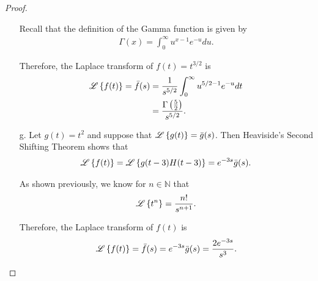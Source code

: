 \begin{proof}
\begin{enumerate}
      Recall that the definition of the Gamma function is given by
      \begin{align*}
        \Gamma(x) = \int_0^\infty u^{x-1} e^{-u} du.
      \end{align*}

      Therefore, the Laplace transform of $f(t) = t^{3/2}$ is
      \begin{align*}
        \mathscr{L}\left\{ {f(t)} \right\} = \bar{f}(s)
        &= \frac{1}{s^{5/2}}\int_0^\infty u^{5/2 - 1}e^{-u}dt \\
        &= \frac{\Gamma\left(\frac{5}{2}\right)}{s^{5/2}}.
      \end{align*}
    \item[g.] Let $g(t)= t^2$ and suppose that
      $\mathscr{L}\left\{ {g(t)} \right\} = \bar{g}(s)$. Then Heaviside's Second Shifting Theorem shows that
      \begin{align*}
        \mathscr{L}\left\{ {f(t)} \right\} = \mathscr{L}\left\{ {g(t-3)H(t-3)} \right\} = e^{-3s} \bar{g}(s).
      \end{align*}

      As shown previously, we know for $n\in\mathbb{N}$ that
      \begin{align*}
        \mathscr{L}\left\{ {t^n} \right\} = \frac{n!}{s^{n+1}}.
      \end{align*}

      Therefore, the Laplace transform of $f(t)$ is
      \begin{align*}
        \mathscr{L}\left\{ {f(t)} \right\} = \bar{f}(s) = e^{-3s}\bar{g}(s) = \frac{2e^{-3s}}{s^3}.
      \end{align*}
  \end{enumerate}
\end{proof}
\newpage
